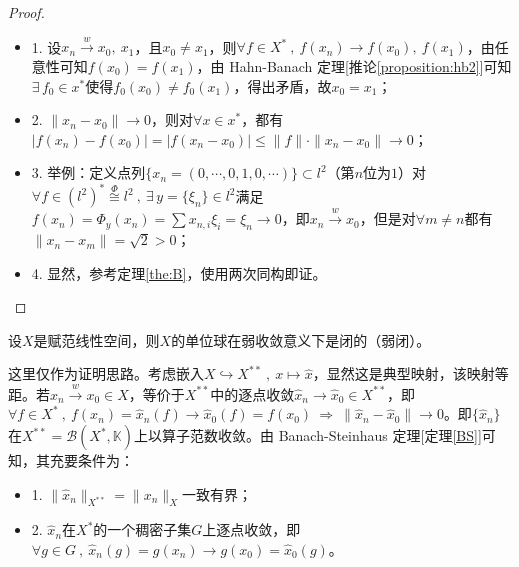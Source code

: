 \begin{proof}
\begin{itemize}
\item 1. 设$x_n \xrightarrow{w} x_0, \ x_1$，且$x_0 \neq x_1$，则$\forall f \in X^* \ , \ f(x_n)\to f(x_0), \ f(x_1)$，由任意性可知$f(x_0)=f(x_1)$，由 Hahn-Banach 定理[推论\ref{proposition:hb2}]可知$\exists \, f_0 \in x^*$使得$f_0(x_0) \neq f_0(x_1)$，得出矛盾，故$x_0=x_1$；
\item 2. $\|x_n-x_0\| \to 0$，则对$\forall x \in x^*$，都有$|f(x_n)-f(x_0)|=|f(x_n-x_0)| \leq \|f\|\cdot\|x_n-x_0\| \to 0$；
\item 3. 举例：定义点列$\{x_n=(0,\cdots,0,1,0,\cdots)\} \subset l^2$（第$n$位为$1$）对$\forall f \in (l^2)^* \mathop{\cong}\limits^{\Phi}l^2 \ , \ \exists \, y=\{\xi_n\}\in l^2$满足$f(x_n)=\Phi_y(x_n)=\sum x_{n,i}\xi_i=\xi_n \to 0$，即$x_n \xrightarrow{w} x_0$，但是对$\forall m \neq n$都有$\|x_n-x_m\|=\sqrt{2}>0$；
\item 4. 显然，参考定理\ref{the:B}，使用两次同构即证。
\end{itemize}
\end{proof}

\begin{theorem}\label{theorem:dwqrb}
设$X$是赋范线性空间，则$X$的单位球在弱收敛意义下是闭的（弱闭）。
\end{theorem}
\begin{remark} \quad
这里仅作为证明思路。考虑嵌入$X \hookrightarrow X^{**} \ , \ x \mapsto \hat{x}$，显然这是典型映射，该映射等距。若$x_n \xrightarrow{w} x_0 \in X$，等价于$X^{**}$中的逐点收敛$\hat{x}_n \to \hat{x}_0 \in X^{**}$，即$\forall f\in X^* \ , \ f(x_n)=\hat{x}_n(f) \to \hat{x}_0(f)=f(x_0) \ \Rightarrow \ \|\hat{x}_n-\hat{x}_0\|\to0$。即$\{\hat{x}_n\}$在$X^{**}=\mathscr{B}(X^*,\mathbb{K})$上以算子范数收敛。由 Banach-Steinhaus 定理[定理\ref{BS}]可知，其充要条件为：
\begin{itemize}
\item 1. $\|\hat{x}_n\|_{X^{**}}=\|x_n\|_X$一致有界；
\item 2. $\hat{x}_n$在$X^*$的一个稠密子集$G$上逐点收敛，即$\forall g \in G \ , \ \hat{x}_n(g)=g(x_n)\to g(x_0)=\hat{x}_0(g)$。
\end{itemize}
\end{remark}

